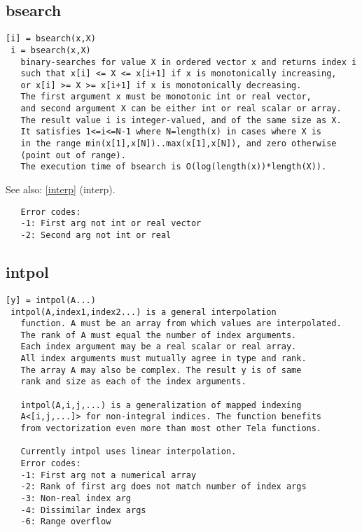 \documentclass[a4paper]{article}
\begin{document}
\subsection{bsearch\label{bsearch}}

\begin{tscreen}
\begin{verbatim}
[i] = bsearch(x,X)
 i = bsearch(x,X)
   binary-searches for value X in ordered vector x and returns index i
   such that x[i] <= X <= x[i+1] if x is monotonically increasing,
   or x[i] >= X >= x[i+1] if x is monotonically decreasing.
   The first argument x must be monotonic int or real vector,
   and second argument X can be either int or real scalar or array.
   The result value i is integer-valued, and of the same size as X.
   It satisfies 1<=i<=N-1 where N=length(x) in cases where X is
   in the range min(x[1],x[N])..max(x[1],x[N]), and zero otherwise
   (point out of range).
   The execution time of bsearch is O(log(length(x))*length(X)).
\end{verbatim}

See also: \ref{interp} {(interp)}.
\begin{verbatim}
   Error codes:
   -1: First arg not int or real vector
   -2: Second arg not int or real
\end{verbatim}
\end{tscreen}



\subsection{intpol\label{intpol}}

\begin{tscreen}
\begin{verbatim}
[y] = intpol(A...)
 intpol(A,index1,index2...) is a general interpolation
   function. A must be an array from which values are interpolated.
   The rank of A must equal the number of index arguments.
   Each index argument may be a real scalar or real array.
   All index arguments must mutually agree in type and rank.
   The array A may also be complex. The result y is of same
   rank and size as each of the index arguments.

   intpol(A,i,j,...) is a generalization of mapped indexing
   A<[i,j,...]> for non-integral indices. The function benefits
   from vectorization even more than most other Tela functions.

   Currently intpol uses linear interpolation.
   Error codes:
   -1: First arg not a numerical array
   -2: Rank of first arg does not match number of index args
   -3: Non-real index arg
   -4: Dissimilar index args
   -6: Range overflow
\end{verbatim}
\end{tscreen}
\end{document}
